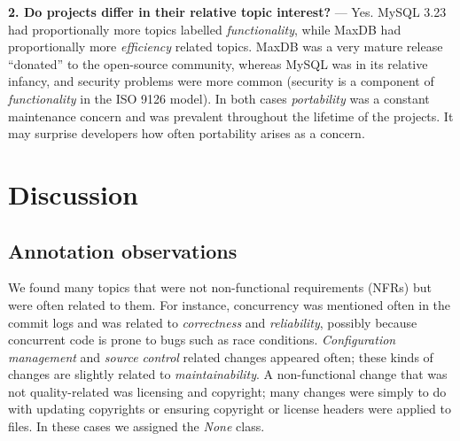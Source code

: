 \documentclass[]{sig-alternate}
\begin{document}
\noindent\textbf{2. Do  projects differ in their relative  topic interest?} ---
Yes. MySQL 3.23 had proportionally more
topics labelled \emph{functionality}, while MaxDB had proportionally more
\emph{efficiency} related topics. MaxDB was a very mature release ``donated'' to the open-source community, 
whereas MySQL was in its relative infancy, and  
security problems were more common (security is a component of \emph{functionality} in the ISO 9126 model). 
In both cases \emph{portability} was a constant maintenance concern and was prevalent throughout the lifetime of the projects. It may surprise developers how often portability arises as a concern.


\section{Discussion}
\label{sec:limit}

\subsection{Annotation observations}
We found many topics that were not non-functional requirements (NFRs) but were often related to them. 
For instance, concurrency was mentioned often in the commit logs and
was related to \emph{correctness} and \emph{reliability}, possibly because concurrent code is prone to bugs such as race conditions. %
\emph{Configuration management} and \emph{source control} related changes appeared often; %
these kinds of changes are slightly related to \emph{maintainability}. 
A non-functional change that was not quality-related was licensing and copyright; many changes were simply to do with updating copyrights or ensuring copyright or license headers were applied to files. In these cases we assigned the \emph{None} class.
\end{document}

